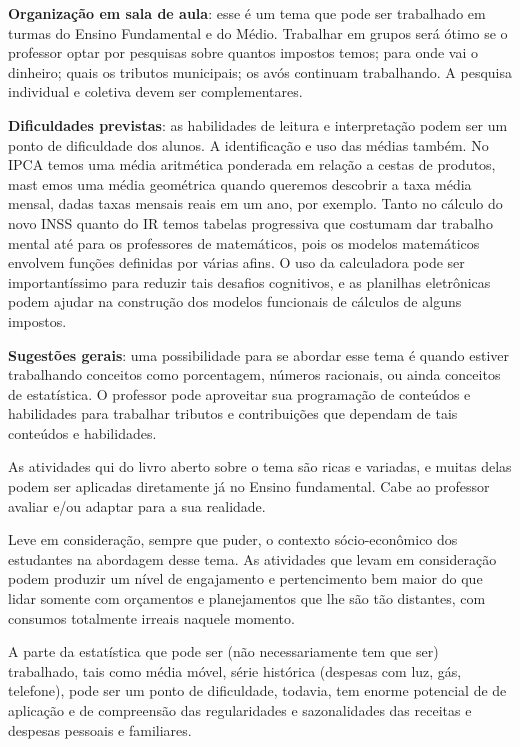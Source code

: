 \begin{paginatexto2}
\textbf{Organização em sala de aula}: esse é um tema que pode ser trabalhado em turmas do Ensino Fundamental e do Médio. Trabalhar em grupos será ótimo se o professor optar por pesquisas sobre quantos impostos temos; para onde vai o dinheiro; quais os tributos municipais; os avós continuam trabalhando. A pesquisa individual e coletiva devem ser complementares.

\textbf{Dificuldades previstas}: as habilidades de leitura e interpretação podem ser um ponto de dificuldade dos alunos. A identificação e uso das médias também. No IPCA temos uma média aritmética ponderada em relação a cestas de produtos, mast emos uma média geométrica quando queremos descobrir a taxa média mensal, dadas taxas mensais reais em um ano, por exemplo. Tanto no cálculo do novo INSS quanto do IR temos tabelas progressiva que costumam dar trabalho mental até para os professores de matemáticos, pois os modelos matemáticos envolvem funções definidas por várias afins. O uso da calculadora pode ser importantíssimo para reduzir tais desafios cognitivos, e as planilhas eletrônicas podem ajudar na construção dos modelos funcionais de cálculos de alguns impostos.

\textbf{Sugestões gerais}: uma possibilidade para se abordar esse tema é quando estiver trabalhando conceitos como porcentagem, números racionais, ou ainda conceitos de estatística. O professor pode aproveitar sua programação de conteúdos e habilidades para trabalhar tributos e contribuições que dependam de tais conteúdos e habilidades.

As atividades qui do livro aberto sobre o tema são ricas e variadas, e muitas delas podem ser aplicadas diretamente já no Ensino fundamental. Cabe ao professor avaliar e/ou adaptar para a sua realidade. 

Leve em consideração, sempre que puder, o contexto sócio-econômico dos estudantes na abordagem desse tema. As atividades que levam em consideração podem produzir um nível de engajamento e pertencimento bem maior do que lidar somente com orçamentos e planejamentos que lhe são tão distantes, com consumos totalmente irreais naquele momento. 

A parte da estatística que pode ser (não necessariamente tem que ser) trabalhado, tais como média móvel, série histórica (despesas com luz, gás, telefone), pode ser um ponto de dificuldade, todavia, tem enorme potencial de de aplicação e de compreensão das regularidades e sazonalidades das receitas e despesas pessoais e familiares.


\end{paginatexto2}
